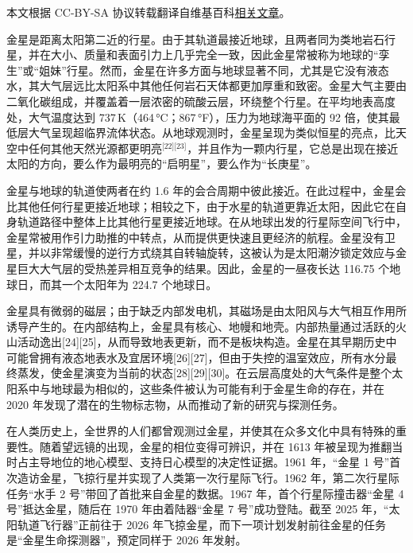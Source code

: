 
本文根据 CC-BY-SA 协议转载翻译自维基百科\href{https://en.wikipedia.org/wiki/Venus}{相关文章}。

金星是距离太阳第二近的行星。由于其轨道最接近地球，且两者同为类地岩石行星，并在大小、质量和表面引力上几乎完全一致，因此金星常被称为地球的“孪生”或“姐妹”行星。然而，金星在许多方面与地球显著不同，尤其是它没有液态水，其大气层远比太阳系中其他任何岩石天体都更加厚重和致密。金星大气主要由二氧化碳组成，并覆盖着一层浓密的硫酸云层，环绕整个行星。在平均地表高度处，大气温度达到 737\,K（464\,°C；867\,°F），压力为地球海平面的 92 倍，使其最低层大气呈现超临界流体状态。从地球观测时，金星呈现为类似恒星的亮点，比天空中任何其他天然光源都更明亮\(^\text{[22][23]}\)，并且作为一颗内行星，它总是出现在接近太阳的方向，要么作为最明亮的“启明星”，要么作为“长庚星”。

金星与地球的轨道使两者在约 1.6 年的会合周期中彼此接近。在此过程中，金星会比其他任何行星更接近地球；相较之下，由于水星的轨道更靠近太阳，因此它在自身轨道路径中整体上比其他行星更接近地球。在从地球出发的行星际空间飞行中，金星常被用作引力助推的中转点，从而提供更快速且更经济的航程。金星没有卫星，并以非常缓慢的逆行方式绕其自转轴旋转，这被认为是太阳潮汐锁定效应与金星巨大大气层的受热差异相互竞争的结果。因此，金星的一昼夜长达 116.75 个地球日，而其一个太阳年为 224.7 个地球日。

金星具有微弱的磁层；由于缺乏内部发电机，其磁场是由太阳风与大气相互作用所诱导产生的。在内部结构上，金星具有核心、地幔和地壳。内部热量通过活跃的火山活动逸出[24][25]，从而导致地表更新，而不是板块构造。金星在其早期历史中可能曾拥有液态地表水及宜居环境[26][27]，但由于失控的温室效应，所有水分最终蒸发，使金星演变为当前的状态[28][29][30]。在云层高度处的大气条件是整个太阳系中与地球最为相似的，这些条件被认为可能有利于金星生命的存在，并在 2020 年发现了潜在的生物标志物，从而推动了新的研究与探测任务。

在人类历史上，全世界的人们都曾观测过金星，并使其在众多文化中具有特殊的重要性。随着望远镜的出现，金星的相位变得可辨识，并在 1613 年被呈现为推翻当时占主导地位的地心模型、支持日心模型的决定性证据。1961 年，“金星 1 号”首次造访金星，飞掠行星并实现了人类第一次行星际飞行。1962 年，第二次行星际任务“水手 2 号”带回了首批来自金星的数据。1967 年，首个行星际撞击器“金星 4 号”抵达金星，随后在 1970 年由着陆器“金星 7 号”成功登陆。截至 2025 年，“太阳轨道飞行器”正前往于 2026 年飞掠金星，而下一项计划发射前往金星的任务是“金星生命探测器”，预定同样于 2026 年发射。
